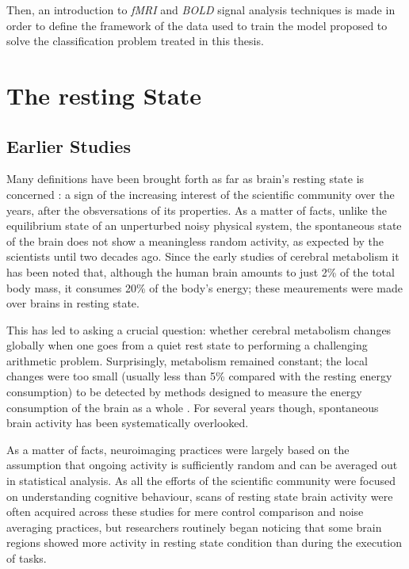 \documentclass[12pt,openright,twoside,a4paper]{book}
\begin{document}
Then, an introduction to \textit{fMRI} and \textit{BOLD} signal analysis techniques is made in order to define the framework of the data used to train the model proposed to solve the classification problem treated in this thesis. 

\section{The resting State}

\subsection{Earlier Studies}

Many definitions have been brought forth as far as brain's resting state is concerned \cite{RNS}: a sign of the increasing interest of the scientific community over the years, after the obsversations of its properties.
As a matter of facts, unlike the equilibrium state of an unperturbed noisy physical system, the spontaneous state of the brain does not show a meaningless random activity, as expected by the scientists until two decades ago.
Since the early studies of cerebral metabolism it has been noted that, although the human brain amounts to just 2\% of the total body mass, it consumes 20\% of the body's energy; these meaurements were made over brains in resting state.

This has led to asking a crucial question: whether cerebral metabolism changes globally when one goes from a quiet rest state to performing a challenging arithmetic problem. 
Surprisingly, metabolism remained constant; the local changes were too small (usually less than 5\% compared with the resting energy consumption) to be detected by methods designed to measure the energy consumption of the brain as a whole \cite{Neuro-Hist}.
For several years though, spontaneous brain activity has been systematically overlooked.

As a matter of facts, neuroimaging practices were largely based on the assumption that ongoing activity is sufficiently random and can be averaged out in statistical analysis.
As all the efforts of the scientific community were focused on understanding cognitive behaviour, scans of resting state brain activity were often acquired across these studies for mere control comparison and noise averaging practices, but researchers routinely began noticing that some brain regions showed more activity in resting state condition than during the execution of tasks.
\end{document}
